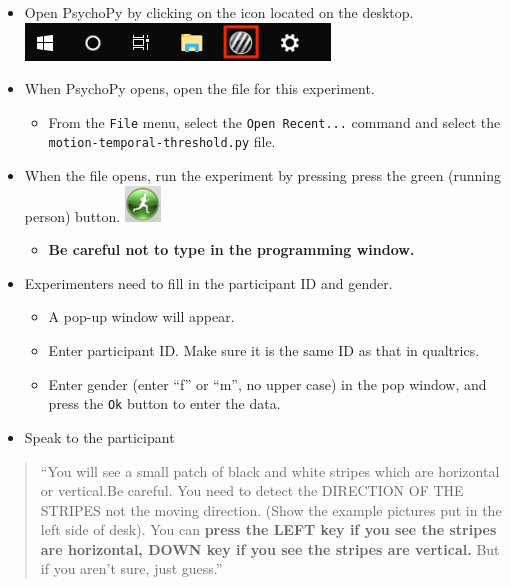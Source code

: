 \documentclass[]{article}
\providecommand{\tightlist}{%
  \setlength{\itemsep}{0pt}\setlength{\parskip}{0pt}}
\begin{document}
\begin{itemize}
\tightlist
\item
  Open PsychoPy by clicking on the icon located on the desktop.
  \includegraphics{images/PsychoPy-1.PNG}\\
\item
  When PsychoPy opens, open the file for this experiment.

  \begin{itemize}
  \tightlist
  \item
    From the \texttt{File} menu, select the \texttt{Open\ Recent...}
    command and select the \texttt{motion-temporal-threshold.py} file.
  \end{itemize}
\item
  When the file opens, run the experiment by pressing press the green
  (running person) button. \includegraphics{images/PPrunningMan.png}

  \begin{itemize}
  \tightlist
  \item
    \textbf{Be careful not to type in the programming window.}
  \end{itemize}
\item
  Experimenters need to fill in the participant ID and gender.

  \begin{itemize}
  \tightlist
  \item
    A pop-up window will appear.
  \item
    Enter participant ID. Make sure it is the same ID as that in
    qualtrics.
  \item
    Enter gender (enter ``f'' or ``m'', no upper case) in the pop
    window, and press the \texttt{Ok} button to enter the data.
  \end{itemize}
\item
  Speak to the participant
\end{itemize}

\begin{quote}
``You will see a small patch of black and white stripes which are
horizontal or vertical.Be careful. You need to detect the DIRECTION OF
THE STRIPES not the moving direction. (Show the example pictures put in
the left side of desk). You can \textbf{press the LEFT key if you see
the stripes are horizontal, DOWN key if you see the stripes are
vertical.} But if you aren't sure, just guess.''
\end{quote}
\end{document}
